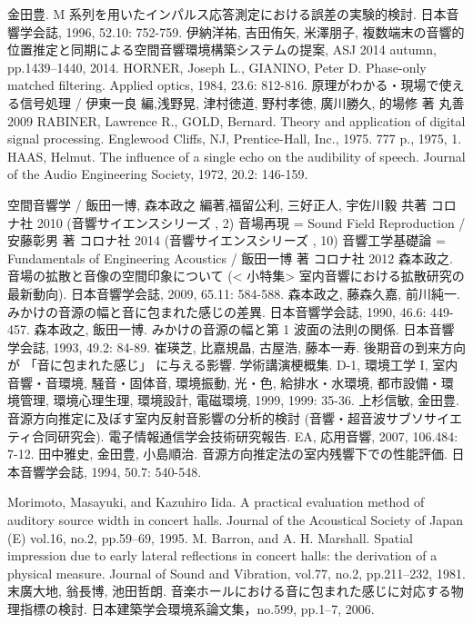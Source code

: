 \begin{thebibliography}{99}
 金田豊. M 系列を用いたインパルス応答測定における誤差の実験的検討. 日本音響学会誌, 1996, 52.10: 752-759.
 伊納洋祐, 吉田侑矢, 米澤朋子,	複数端末の音響的位置推定と同期による空間音響環境構築システムの提案,	ASJ 2014 autumn,	pp.1439--1440,	2014.
       HORNER, Joseph L., GIANINO, Peter D. Phase-only matched filtering. Applied optics, 1984, 23.6: 812-816.
 原理がわかる・現場で使える信号処理 / 伊東一良 編,浅野晃, 津村徳道, 野村孝徳, 廣川勝久, 的場修 著 丸善 2009
  RABINER, Lawrence R., GOLD, Bernard. Theory and application of digital signal processing. Englewood Cliffs, NJ, Prentice-Hall, Inc., 1975. 777 p., 1975, 1.
      HAAS, Helmut. The influence of a single echo on the audibility of speech. Journal of the Audio Engineering Society, 1972, 20.2: 146-159.


 空間音響学 / 飯田一博, 森本政之 編著,福留公利, 三好正人, 宇佐川毅 共著 コロナ社 2010 (音響サイエンスシリーズ , 2)
 音場再現 = Sound Field Reproduction / 安藤彰男 著 コロナ社 2014 (音響サイエンスシリーズ , 10)
 音響工学基礎論 = Fundamentals of Engineering Acoustics / 飯田一博 著 コロナ社 2012
 森本政之. 音場の拡散と音像の空間印象について (< 小特集> 室内音響における拡散研究の最新動向). 日本音響学会誌, 2009, 65.11: 584-588.
 森本政之, 藤森久嘉, 前川純一. みかけの音源の幅と音に包まれた感じの差異. 日本音響学会誌, 1990, 46.6:	449-457.
 森本政之, 飯田一博. みかけの音源の幅と第 1 波面の法則の関係. 日本音響学会誌, 1993, 49.2: 84-89.
 崔瑛芝, 比嘉規晶, 古屋浩, 藤本一寿. 後期音の到来方向が 「音に包まれた感じ」 に与える影響. 学術講演梗概集. D-1, 環境工学 I, 室内音響・音環境, 騒音・固体音, 環境振動, 光・色, 給排水・水環境, 都市設備・環境管理, 環境心理生理, 環境設計, 電磁環境, 1999, 1999: 35-36.
 上杉信敏, 金田豊. 音源方向推定に及ぼす室内反射音影響の分析的検討 (音響・超音波サブソサイエティ合同研究会). 電子情報通信学会技術研究報告. EA, 応用音響, 2007, 106.484: 7-12.
 田中雅史, 金田豊, 小島順治. 音源方向推定法の室内残響下での性能評価. 日本音響学会誌, 1994, 50.7: 540-548.

 Morimoto, Masayuki, and Kazuhiro Iida. A practical evaluation method of auditory source width in concert halls. Journal of the Acoustical Society of Japan (E) vol.16, no.2, pp.59--69, 1995.
 M. Barron, and A. H. Marshall. Spatial impression due to early lateral reflections in concert halls: the derivation of a physical measure. Journal of Sound and Vibration, vol.77, no.2, pp.211--232, 1981.
 末廣大地, 翁長博, 池田哲朗. 音楽ホールにおける音に包まれた感じに対応する物理指標の検討. 日本建築学会環境系論文集，no.599, pp.1--7, 2006.


\end{thebibliography}
